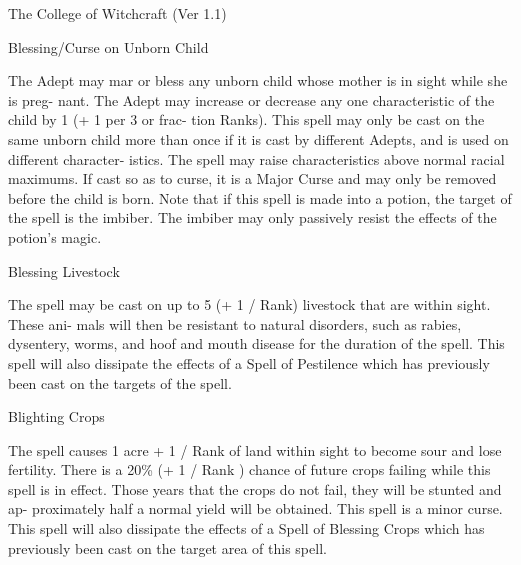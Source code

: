 \begin{Chapter}{The College of Witchcraft (Ver 1.1)}
\begin{spell}[S-2]{Blessing/Curse on Unborn Child}
\begin{effects}
 The  Adept  may  mar  or  bless  any  unborn 
child  whose  mother  is  in  sight  while  she  is  preg-
nant. The Adept may increase or decrease any one 
characteristic  of  the  child  by  1  (+  1  per  3  or  frac-
tion  Ranks).  This  spell  may  only  be  cast  on  the 
same  unborn  child  more  than  once  if  it  is  cast  by 
different Adepts, and is used on different character-
istics.  The  spell  may  raise  characteristics  above 
normal racial maximums. If cast so as to curse, it is 
a Major Curse and may only be removed before the 
child is born. Note that if this spell is made into a 
potion,  the  target  of  the  spell  is  the  imbiber.  The 
imbiber may only passively resist the effects of the 
potion’s magic. 

\end{effects}
\end{spell}

\begin{spell}[S-3]{Blessing Livestock }

\begin{effects}
 The  spell  may  be  cast  on  up  to  5  (+  1  / 
Rank)  livestock  that  are  within  sight.  These  ani-
mals  will  then  be  resistant  to  natural  disorders, 
such  as  rabies,  dysentery,  worms,  and  hoof  and 
mouth  disease  for  the  duration  of  the  spell.  This 
spell  will  also  dissipate  the  effects  of  a  Spell  of 
Pestilence  which  has  previously  been  cast  on  the 
targets of the spell. 

\end{effects}
\end{spell}

\begin{spell}[S-4]{Blighting Crops }

\begin{effects}
The spell causes 1 acre + 1 / Rank of land 
within  sight  to  become  sour  and  lose  fertility. 
There is a 20\% (+ 1 / Rank ) chance of future crops 
failing while this spell is in effect. Those years that 
the  crops  do  not  fail,  they  will  be  stunted  and  ap-
proximately  half  a  normal  yield  will  be  obtained. 
This  spell  is  a  minor  curse.  This  spell  will  also 
dissipate  the  effects  of  a  Spell  of  Blessing  Crops 
which  has  previously  been  cast  on  the  target  area 
of this spell. 


\end{effects}
\end{spell}
\end{Chapter}
